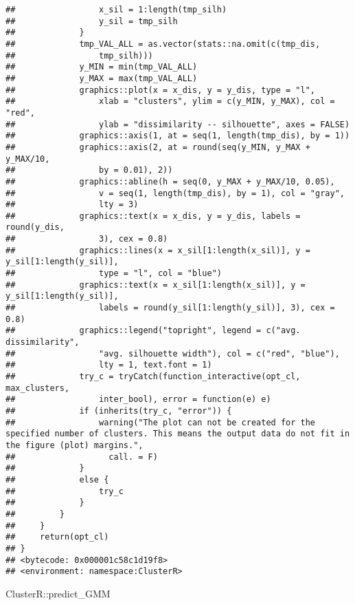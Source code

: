 \documentclass[
]{article}
\newenvironment{Shaded}{\begin{snugshade}}{\end{snugshade}}
\newcommand{\NormalTok}[1]{#1}
\newcommand{\SpecialCharTok}[1]{\textcolor[rgb]{0.00,0.00,0.00}{#1}}
\begin{document}
\begin{verbatim}
##                 x_sil = 1:length(tmp_silh)
##                 y_sil = tmp_silh
##             }
##             tmp_VAL_ALL = as.vector(stats::na.omit(c(tmp_dis, 
##                 tmp_silh)))
##             y_MIN = min(tmp_VAL_ALL)
##             y_MAX = max(tmp_VAL_ALL)
##             graphics::plot(x = x_dis, y = y_dis, type = "l", 
##                 xlab = "clusters", ylim = c(y_MIN, y_MAX), col = "red", 
##                 ylab = "dissimilarity -- silhouette", axes = FALSE)
##             graphics::axis(1, at = seq(1, length(tmp_dis), by = 1))
##             graphics::axis(2, at = round(seq(y_MIN, y_MAX + y_MAX/10, 
##                 by = 0.01), 2))
##             graphics::abline(h = seq(0, y_MAX + y_MAX/10, 0.05), 
##                 v = seq(1, length(tmp_dis), by = 1), col = "gray", 
##                 lty = 3)
##             graphics::text(x = x_dis, y = y_dis, labels = round(y_dis, 
##                 3), cex = 0.8)
##             graphics::lines(x = x_sil[1:length(x_sil)], y = y_sil[1:length(y_sil)], 
##                 type = "l", col = "blue")
##             graphics::text(x = x_sil[1:length(x_sil)], y = y_sil[1:length(y_sil)], 
##                 labels = round(y_sil[1:length(y_sil)], 3), cex = 0.8)
##             graphics::legend("topright", legend = c("avg. dissimilarity", 
##                 "avg. silhouette width"), col = c("red", "blue"), 
##                 lty = 1, text.font = 1)
##             try_c = tryCatch(function_interactive(opt_cl, max_clusters, 
##                 inter_bool), error = function(e) e)
##             if (inherits(try_c, "error")) {
##                 warning("The plot can not be created for the specified number of clusters. This means the output data do not fit in the figure (plot) margins.", 
##                   call. = F)
##             }
##             else {
##                 try_c
##             }
##         }
##     }
##     return(opt_cl)
## }
## <bytecode: 0x000001c58c1d19f8>
## <environment: namespace:ClusterR>
\end{verbatim}

\begin{Shaded}
\begin{Highlighting}[]
\NormalTok{ClusterR}\SpecialCharTok{::}\NormalTok{predict\_GMM}
\end{Highlighting}
\end{Shaded}
\end{document}

